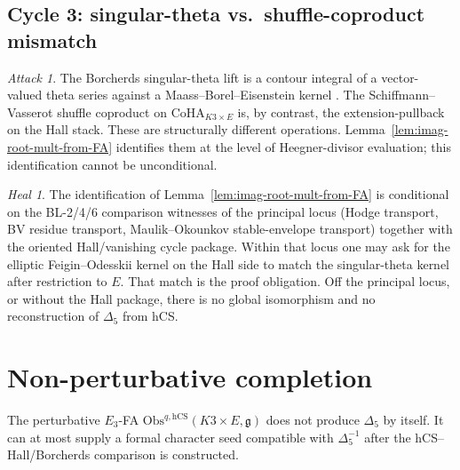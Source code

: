 \documentclass[11pt]{amsart}
\providecommand{\frakg}{\mathfrak{g}}
\providecommand{\Obs}{\mathrm{Obs}}
\providecommand{\hCS}{\mathrm{hCS}}
\theoremstyle{plain}
\theoremstyle{definition}
\theoremstyle{remark}
\newtheorem{attack}[theorem]{Attack}
\newtheorem{heal}[theorem]{Heal}
\begin{document}
\subsection{Cycle 3: singular-theta vs.\ shuffle-coproduct mismatch}

\begin{attack}
\label{attack:singular-theta-shuffle-mismatch}
The Borcherds singular-theta lift is a contour integral of a vector-%
valued theta series against a Maass--Borel--Eisenstein kernel
\cite{Borcherds1998}. The Schiffmann--Vasserot shuffle coproduct
\cite{SchiffmannVasserot2013} on $\mathrm{CoHA}_{K3\times E}$ is, by
contrast, the extension-pullback on the Hall stack. These are
structurally different operations. Lemma~\ref{lem:imag-root-mult-from-FA}
identifies them at the level of Heegner-divisor evaluation; this
identification cannot be unconditional.
\end{attack}

\begin{heal}
\label{heal:singular-theta-shuffle-mismatch}
The identification of Lemma~\ref{lem:imag-root-mult-from-FA} is
conditional on the BL-2/4/6 comparison witnesses of the principal
locus (Hodge transport, BV residue transport, Maulik--Okounkov
stable-envelope transport) together with the oriented Hall/vanishing
cycle package. Within that locus one may ask for the elliptic
Feigin--Odesskii kernel on the Hall side to match the singular-theta
kernel after restriction to $E$. That match is the proof obligation.
Off the principal locus, or without the Hall package, there is no
global isomorphism and no reconstruction of $\Delta_{5}$ from hCS.
\end{heal}

\section{Non-perturbative completion}
\label{sec:non-perturbative-completion}

The perturbative $E_{3}$-FA $\Obs^{q,\hCS}(K3\times E,\frakg)$ does not
produce $\Delta_{5}$ by itself. It can at most supply a formal character
seed compatible with $\Delta_{5}^{-1}$ after the hCS--Hall/Borcherds
comparison is constructed.
\end{document}
